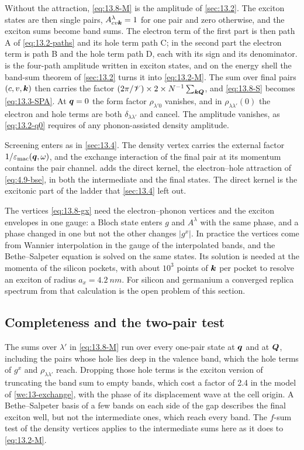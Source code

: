 Without the attraction, \cref{eq:13.8-M} is the amplitude of \cref{sec:13.2}. The exciton states are then single pairs, $A^\lambda_{cv\bm{k}} = 1$ for one pair and zero otherwise, and the exciton sums become band sums. The electron term of the first part is then path A of \cref{eq:13.2-paths} and its hole term path C; in the second part the electron term is path B and the hole term path D, each with its sign and its denominator.  is the four-path amplitude written in exciton states, and on the energy shell the band-sum theorem of \cref{sec:13.2} turns it into \cref{eq:13.2-M}. The sum over final pairs $(c,v,\bm{k})$ then carries the factor $(2\pi/\mathscr{V})\times2\times N^{-1}\sum_{\bm{k}\bm{Q}}$, and \cref{eq:13.8-S} becomes \cref{eq:13.3-SPA}. At $\bm{q} = 0$ the form factor $\rho_{\lambda'0}$ vanishes, and in $\rho_{\lambda\lambda'}(0)$ the electron and hole terms are both $\delta_{\lambda\lambda'}$ and cancel. The amplitude vanishes, as \cref{eq:13.2-q0} requires of any phonon-assisted density amplitude.

Screening enters as in \cref{sec:13.4}. The density vertex carries the external factor $1/\varepsilon_{\mathrm{mac}}(\bm{q},\omega)$, and the exchange interaction of the final pair at its momentum contains the pair channel.  adds the direct kernel, the electron--hole attraction of \cref{eq:4.9-bse}, in both the intermediate and the final states. The direct kernel is the excitonic part of the ladder that \cref{sec:13.4} left out.

The vertices \cref{eq:13.8-gx} need the electron--phonon vertices and the exciton envelopes in one gauge: a Bloch state enters $g$ and $A^\lambda$ with the same phase, and a phase changed in one but not the other changes $|g^x|$. In practice the vertices come from Wannier interpolation in the gauge of the interpolated bands, and the Bethe--Salpeter equation is solved on the same states. Its solution is needed at the momenta of the silicon pockets, with about $10^3$ points of $\bm{k}$ per pocket to resolve an exciton of radius $a_x = \SI{4.2}{nm}$. For silicon and germanium a converged replica spectrum from that calculation is the open problem of this section.

\subsection{Completeness and the two-pair test}

The sums over $\lambda'$ in \cref{eq:13.8-M} run over every one-pair state at $\bm{q}$ and at $\bm{Q}$, including the pairs whose hole lies deep in the valence band, which the hole terms of $g^x$ and $\rho_{\lambda\lambda'}$ reach. Dropping those hole terms is the exciton version of truncating the band sum to empty bands, which cost a factor of 2.4 in the model of \cref{we:13-exchange}, with the phase of its displacement wave at the cell origin. A Bethe--Salpeter basis of a few bands on each side of the gap describes the final exciton well, but not the intermediate ones, which reach every band. The $f$-sum test of the density vertices applies to the intermediate sums here as it does to \cref{eq:13.2-M}.

